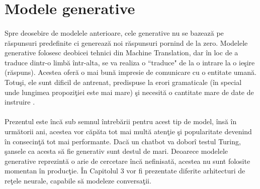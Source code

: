 \section{Modele generative}

\paragraph{}
Spre deosebire de modelele anterioare, cele generative nu se bazeaz\u a pe r\u aspunsuri predefinite ci genereaz\u a noi r\u aspunsuri pornind de la zero. Modelele generative folosesc deobicei tehnici din Machine Translation, dar \^ in loc de a traduce dintr-o limb\u a \^ intr-alta, se va realiza o ``traduce" de la o intrare la o ie\c sire (r\u aspuns). Acestea ofer\u a o mai bun\u a impresie de comunicare cu o entitate uman\u a. Totu\c si, ele sunt dificil de antrenat, predispuse la erori gramaticale (\^ in special unde lungimea propozi\c tiei este mai mare) \c si necesit\u a o cantitate mare de date de instruire \cite{wildml-chatbots}.

\paragraph{}
Prezentul este \^ inc\u a sub semnul \^ intreb\u arii pentru acest tip de model, \^ ins\u a \^ in urm\u atorii ani, acestea vor c\u ap\u ata tot mai mult\u a aten\c tie \c si popularitate devenind \^ in consecin\c t\u a tot mai performante. Dac\u a un chatbot va dobor\^ i testul Turing, \c sansele ca acesta s\u a fie generativ sunt destul de mari. Deoarece modelele generative reprezint\u a o arie de cercetare \^ inc\u a nefinisat\u a, acestea nu sunt folosite momentan \^ in produc\c tie. \^ In Capitolul 3 vor fi prezentate diferite arhitecturi de re\c tele neurale, capabile s\u a modeleze conversa\c tii.